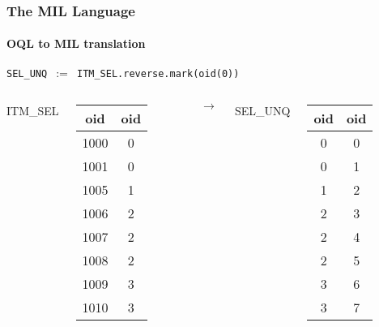\documentclass{beamer}
\begin{document}
\begin{frame}
  \frametitle{The MIL Language}
  \framesubtitle{OQL to MIL translation}

  \begin{block}{}
  {\tt SEL\_UNQ $:=$ ITM\_SEL.reverse.mark(oid(0))}
  \end{block}

  \begin{columns}

  \column{1cm}

  ITM\_SEL
  \begin{tabular}{|c|c|}
    \hline
    oid & oid \\
    \hline
    1000 & 0 \\
    1001 & 0 \\
    1005 & 1 \\
    1006 & 2 \\
    1007 & 2 \\
    1008 & 2 \\
    1009 & 3 \\
    1010 & 3 \\
    \hline
  \end{tabular}

  \column{1cm}

  $\longrightarrow$

  \column{1cm}

  SEL\_UNQ
  \begin{tabular}{|c|c|}
    \hline
    oid & oid \\
    \hline
    0 & 0 \\
    0 & 1 \\
    1 & 2 \\
    2 & 3 \\
    2 & 4 \\
    2 & 5 \\
    3 & 6 \\
    3 & 7 \\
    \hline
  \end{tabular}

  \end{columns}

\end{frame}
\end{document}
